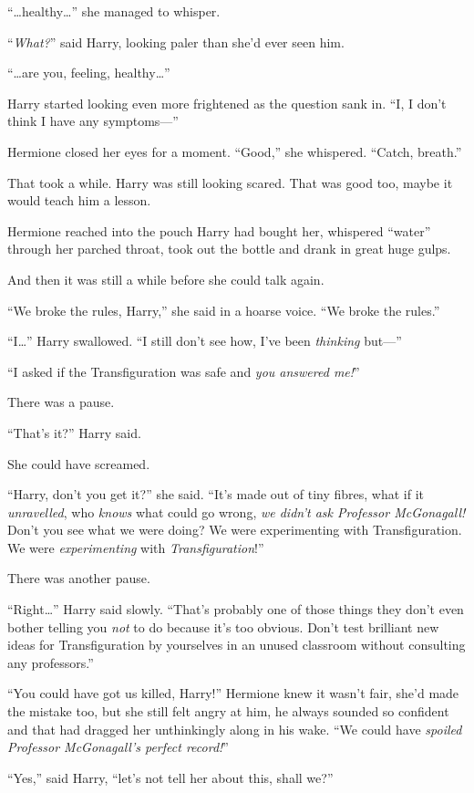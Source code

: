 “…healthy…” she managed to whisper.

“\emph{What?}” said Harry, looking paler than she’d ever seen him.

“…are you, feeling, healthy…”

Harry started looking even more frightened as the question sank in. “I, I don’t think I have any symptoms—”

Hermione closed her eyes for a moment. “Good,” she whispered. “Catch, breath.”

That took a while. Harry was still looking scared. That was good too, maybe it would teach him a lesson.

Hermione reached into the pouch Harry had bought her, whispered “water” through her parched throat, took out the bottle and drank in great huge gulps.

And then it was still a while before she could talk again.

“We broke the rules, Harry,” she said in a hoarse voice. “We broke the rules.”

“I…” Harry swallowed. “I still don’t see how, I’ve been \emph{thinking} but—”

“I asked if the Transfiguration was safe and \emph{you answered me!}”

There was a pause.

“That’s it?” Harry said.

She could have screamed.

“Harry, don’t you get it?” she said. “It’s made out of tiny fibres, what if it \emph{unravelled}, who \emph{knows} what could go wrong, \emph{we didn’t ask Professor McGonagall!} Don’t you see what we were doing? We were experimenting with Transfiguration. We were \emph{experimenting} with \emph{Transfiguration}!”

There was another pause.

“Right…” Harry said slowly. “That’s probably one of those things they don’t even bother telling you \emph{not} to do because it’s too obvious. Don’t test brilliant new ideas for Transfiguration by yourselves in an unused classroom without consulting any professors.”

“You could have got us killed, Harry!” Hermione knew it wasn’t fair, she’d made the mistake too, but she still felt angry at him, he always sounded so confident and that had dragged her unthinkingly along in his wake. “We could have \emph{spoiled Professor McGonagall’s perfect record!}”

“Yes,” said Harry, “let’s not tell her about this, shall we?”

